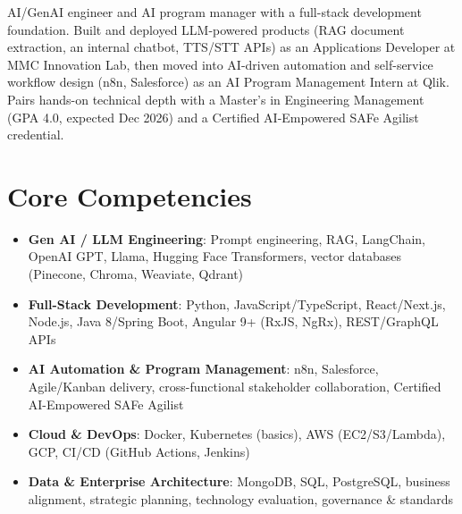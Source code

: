 \documentclass[11pt,a4paper,sans]{moderncv}
\begin{document}
\makecvtitle


\vspace{6pt}
\small{AI/GenAI engineer and AI program manager with a full-stack development foundation. Built and deployed LLM-powered products (RAG document extraction, an internal chatbot, TTS/STT APIs) as an Applications Developer at MMC Innovation Lab, then moved into AI-driven automation and self-service workflow design (n8n, Salesforce) as an AI Program Management Intern at Qlik. Pairs hands-on technical depth with a Master's in Engineering Management (GPA 4.0, expected Dec 2026) and a Certified AI-Empowered SAFe Agilist credential.}


\section{Core Competencies}
\vspace{1pt}
\begin{itemize}

\item \textbf{Gen AI / LLM Engineering}: Prompt engineering, RAG, LangChain, OpenAI GPT, Llama, Hugging Face Transformers, vector databases (Pinecone, Chroma, Weaviate, Qdrant)

\item \textbf{Full-Stack Development}: Python, JavaScript/TypeScript, React/Next.js, Node.js, Java 8/Spring Boot, Angular 9+ (RxJS, NgRx), REST/GraphQL APIs

\item \textbf{AI Automation \& Program Management}: n8n, Salesforce, Agile/Kanban delivery, cross-functional stakeholder collaboration, Certified AI-Empowered SAFe Agilist

\item \textbf{Cloud \& DevOps}: Docker, Kubernetes (basics), AWS (EC2/S3/Lambda), GCP, CI/CD (GitHub Actions, Jenkins)

\item \textbf{Data \& Enterprise Architecture}: MongoDB, SQL, PostgreSQL, business alignment, strategic planning, technology evaluation, governance \& standards

\end{itemize}
\end{document}
